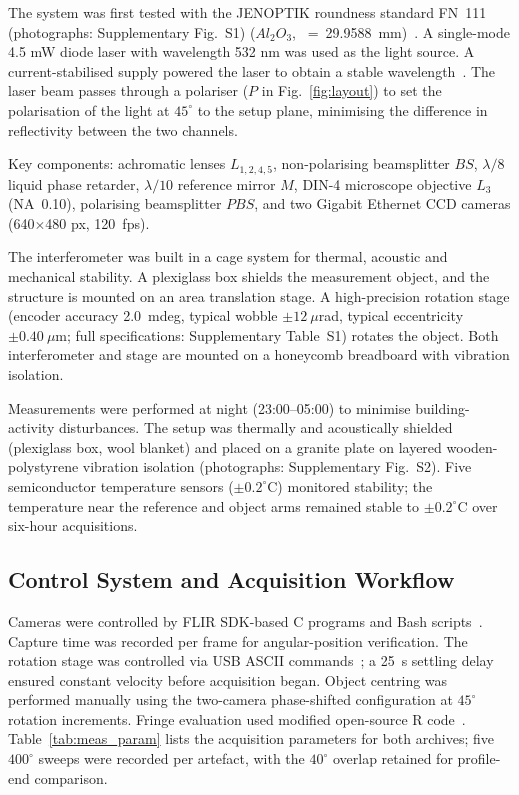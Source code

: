 \documentclass[review]{elsarticle}
\begin{document}
The system was first tested with the JENOPTIK roundness standard FN~111 (photographs: Supplementary Fig.~S1) ($Al_2O_3$, \diameter~=~29.9588~mm)~\cite{JENOPTIK_ball}. A single-mode 4.5 mW diode laser with wavelength 532 nm was used as the light source. A current-stabilised supply powered the laser to obtain a stable wavelength~\cite{thorlabs_CPS532}. The laser beam passes through a polariser ($P$ in Fig.~\ref{fig:layout}) to set the polarisation of the light at $45^\circ$ to the setup plane, minimising the difference in reflectivity between the two channels.

Key components: achromatic lenses $L_{1,2,4,5}$, non-polarising beamsplitter $BS$, $\lambda/8$ liquid phase retarder, $\lambda/10$ reference mirror $M$, DIN-4 microscope objective $L_3$ (NA~0.10), polarising beamsplitter $PBS$, and two Gigabit Ethernet CCD cameras (640$\times$480 px, 120~fps).

The interferometer was built in a cage system for thermal, acoustic and mechanical stability. A plexiglass box shields the measurement object, and the structure is mounted on an area translation stage. A high-precision rotation stage (encoder accuracy 2.0~mdeg, typical wobble $\pm 12~\mu$rad, typical eccentricity $\pm 0.40~\mu$m; full specifications: Supplementary Table~S1) rotates the object. Both interferometer and stage are mounted on a honeycomb breadboard with vibration isolation.

Measurements were performed at night (23:00--05:00) to minimise building-activity disturbances. The setup was thermally and acoustically shielded (plexiglass box, wool blanket) and placed on a granite plate on layered wooden-polystyrene vibration isolation (photographs: Supplementary Fig.~S2). Five semiconductor temperature sensors ($\pm 0.2^\circ$C) monitored stability; the temperature near the reference and object arms remained stable to $\pm 0.2^\circ$C over six-hour acquisitions.

\subsection{Control System and Acquisition Workflow}
Cameras were controlled by FLIR SDK-based C programs and Bash scripts~\cite{FLIR_sdk}. Capture time was recorded per frame for angular-position verification. The rotation stage was controlled via USB ASCII commands~\cite{newport_esp_manual}; a 25~s settling delay ensured constant velocity before acquisition began. Object centring was performed manually using the two-camera phase-shifted configuration at $45^\circ$ rotation increments. Fringe evaluation used modified open-source R code~\cite{Meijer2018a,Ihaka1996}. Table~\ref{tab:meas_param} lists the acquisition parameters for both archives; five $400^\circ$ sweeps were recorded per artefact, with the $40^\circ$ overlap retained for profile-end comparison.
\end{document}
